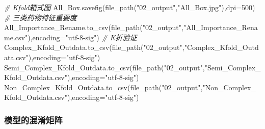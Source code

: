 \documentclass[
]{article}
\newenvironment{Shaded}{}{}
\newcommand{\CommentTok}[1]{\textcolor[rgb]{0.38,0.63,0.69}{\textit{#1}}}
\newcommand{\DecValTok}[1]{\textcolor[rgb]{0.25,0.63,0.44}{#1}}
\newcommand{\NormalTok}[1]{#1}
\newcommand{\OperatorTok}[1]{\textcolor[rgb]{0.40,0.40,0.40}{#1}}
\newcommand{\StringTok}[1]{\textcolor[rgb]{0.25,0.44,0.63}{#1}}
\begin{document}
\begin{Shaded}
\begin{Highlighting}[]
\CommentTok{\# Kfold箱式图}
\NormalTok{All\_Box.savefig(file\_path(}\StringTok{"02\_output"}\NormalTok{,}\StringTok{"All\_Box.jpg"}\NormalTok{),dpi}\OperatorTok{=}\DecValTok{500}\NormalTok{)}
\CommentTok{\# 三类药物特征重要度}
\NormalTok{All\_Importance\_Rename.to\_csv(file\_path(}\StringTok{"02\_output"}\NormalTok{,}\StringTok{"All\_Importance\_Rename.csv"}\NormalTok{),encoding}\OperatorTok{=}\StringTok{"utf{-}8{-}sig"}\NormalTok{)}
\CommentTok{\# K折验证}
\NormalTok{Complex\_Kfold\_Outdata.to\_csv(file\_path(}\StringTok{"02\_output"}\NormalTok{,}\StringTok{"Complex\_Kfold\_Outdata.csv"}\NormalTok{),encoding}\OperatorTok{=}\StringTok{"utf{-}8{-}sig"}\NormalTok{)}
\NormalTok{Semi\_Complex\_Kfold\_Outdata.to\_csv(file\_path(}\StringTok{"02\_output"}\NormalTok{,}\StringTok{"Semi\_Complex\_Kfold\_Outdata.csv"}\NormalTok{),encoding}\OperatorTok{=}\StringTok{"utf{-}8{-}sig"}\NormalTok{)}
\NormalTok{Non\_Complex\_Kfold\_Outdata.to\_csv(file\_path(}\StringTok{"02\_output"}\NormalTok{,}\StringTok{"Non\_Complex\_Kfold\_Outdata.csv"}\NormalTok{),encoding}\OperatorTok{=}\StringTok{"utf{-}8{-}sig"}\NormalTok{)}
\end{Highlighting}
\end{Shaded}

\hypertarget{header-n357}{%
\subsubsection{模型的混淆矩阵}\label{header-n357}}
\end{document}
